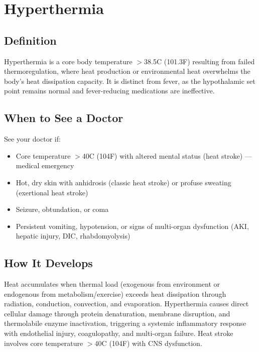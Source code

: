 \chapter{Hyperthermia}

\section*{Definition}
Hyperthermia is a core body temperature \ensuremath{>}38.5\textdegree{}C (101.3\textdegree{}F) resulting from failed thermoregulation, where heat production or environmental heat overwhelms the body's heat dissipation capacity. It is distinct from fever, as the hypothalamic set point remains normal and fever-reducing medications are ineffective.

\section*{When to See a Doctor}
See your doctor if:
\begin{itemize}
  \item Core temperature \ensuremath{>}40\textdegree{}C (104\textdegree{}F) with altered mental status (heat stroke) --- medical emergency
  \item Hot, dry skin with anhidrosis (classic heat stroke) or profuse sweating (exertional heat stroke)
  \item Seizure, obtundation, or coma
  \item Persistent vomiting, hypotension, or signs of multi-organ dysfunction (AKI, hepatic injury, DIC, rhabdomyolysis)
\end{itemize}

\section*{How It Develops}
Heat accumulates when thermal load (exogenous from environment or endogenous from metabolism/exercise) exceeds heat dissipation through radiation, conduction, convection, and evaporation. Hyperthermia causes direct cellular damage through protein denaturation, membrane disruption, and thermolabile enzyme inactivation, triggering a systemic inflammatory response with endothelial injury, coagulopathy, and multi-organ failure. Heat stroke involves core temperature \ensuremath{>}40\textdegree{}C (104\textdegree{}F) with CNS dysfunction.

